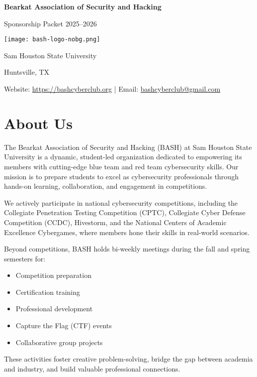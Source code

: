 \documentclass[11pt,letterpaper]{article}
\begin{document}
\pagecolor{DarkGray} %
\color{white}

\begin{titlepage}
    \centering
    \vspace*{2cm}
    {\Huge\color{primaryorange}\textbf{Bearkat Association of Security and Hacking}\par}
    \vspace{0.5cm}
    {\Large Sponsorship Packet 2025--2026}\par
    
    \vspace{2cm}
    \texttt{[image: bash-logo-nobg.png]}\par
    \vspace{2cm}
    
    {\large Sam Houston State University}\par
    \vspace{0.5cm}
    {\large Huntsville, TX}\par
    \vfill
    {\normalsize Website: \url{https://bashcyberclub.org} | Email: \href{mailto:bashcyberclub@gmail.com}{bashcyberclub@gmail.com}}\par
    \vspace{1cm}
\end{titlepage}

\section*{About Us}
The Bearkat Association of Security and Hacking (BASH) at Sam Houston State University is a dynamic, student-led organization dedicated to empowering its members with cutting-edge blue team and red team cybersecurity skills. Our mission is to prepare students to excel as cybersecurity professionals through hands-on learning, collaboration, and engagement in competitions.

We actively participate in national cybersecurity competitions, including the Collegiate Penetration Testing Competition (CPTC), Collegiate Cyber Defense Competition (CCDC), Hivestorm, and the National Centers of Academic Excellence Cybergames, where members hone their skills in real-world scenarios.

Beyond competitions, BASH holds bi-weekly meetings during the fall and spring semesters for:
\begin{itemize}
    \item Competition preparation
    \item Certification training
    \item Professional development
    \item Capture the Flag (CTF) events
    \item Collaborative group projects
\end{itemize}
These activities foster creative problem-solving, bridge the gap between academia and industry, and build valuable professional connections.
\end{document}

